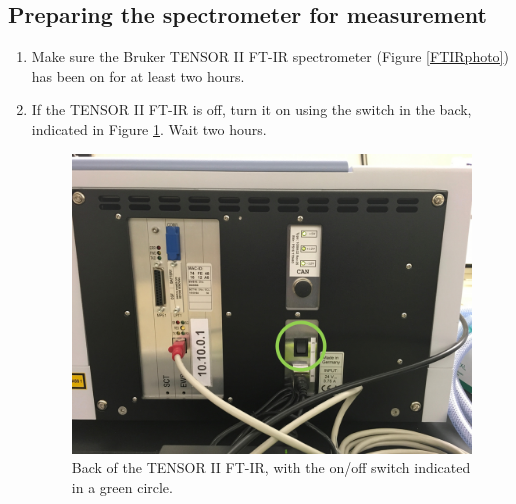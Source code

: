 \subsection{Preparing the spectrometer for measurement}
\begin{enumerate}
    \item Make sure the Bruker TENSOR II FT-IR spectrometer (Figure \ref{FTIRphoto}) has been on for at least two hours.
    \item If the TENSOR II FT-IR is off, turn it on using the switch in the back, indicated in Figure \ref{FTIRswitch}. Wait two hours.
\begin{figure}[htp]
\begin{center}
\includegraphics[width=6.5in]{onoffswitchcircle.png}
\caption{Back of the TENSOR II FT-IR, with the on/off switch indicated in a green circle.}
\label{FTIRswitch}
\end{center}
\end{figure}


\end{enumerate}
